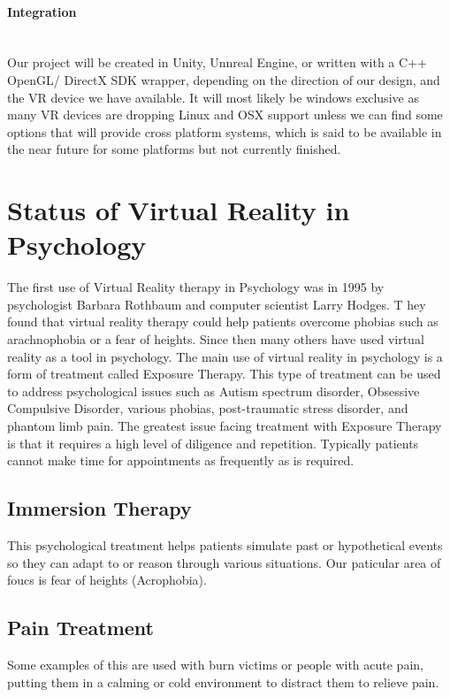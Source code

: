 \documentclass[a4paper,10pt]{article}
\begin{document}
	\paragraph{Integration} ~\\ Our project will be created in Unity, Unnreal Engine, or written with a C++ OpenGL/ DirectX SDK wrapper, depending on the direction of our design, and the VR device we have available. It will most likely be windows exclusive as many VR devices are dropping Linux and OSX support unless we can find some options that will provide cross platform systems, which is said to be available in the near future for some platforms but not currently finished.  
	
	\pagebreak
	
	\section{Status of Virtual Reality in Psychology}
	The first use of Virtual Reality therapy in Psychology was in 1995 by psychologist Barbara Rothbaum and computer scientist Larry Hodges. T
	hey found that virtual reality therapy could help patients overcome phobias such as arachnophobia or a fear of heights. Since then many others 
	have used virtual reality as a tool in psychology. The main use of virtual reality in psychology is a form of treatment called Exposure Therapy. 
	This type of treatment can be used to address psychological issues such as Autism spectrum disorder, Obsessive Compulsive Disorder, various phobias, 
	post-traumatic stress disorder, and phantom limb pain. The greatest issue facing treatment with Exposure Therapy is that it requires a high level of diligence and
	repetition. Typically patients cannot make time for appointments as frequently as is required.
	
	\subsection{Immersion Therapy}
	This psychological treatment helps patients simulate past or hypothetical events so they can adapt to or reason through
	various situations. Our paticular area of foucs is fear of heights (Acrophobia).
	\subsection{Pain Treatment}
	Some examples of this are used with burn victims or people with acute pain, putting them in a calming or cold environment to distract them to relieve pain.
\end{document}
